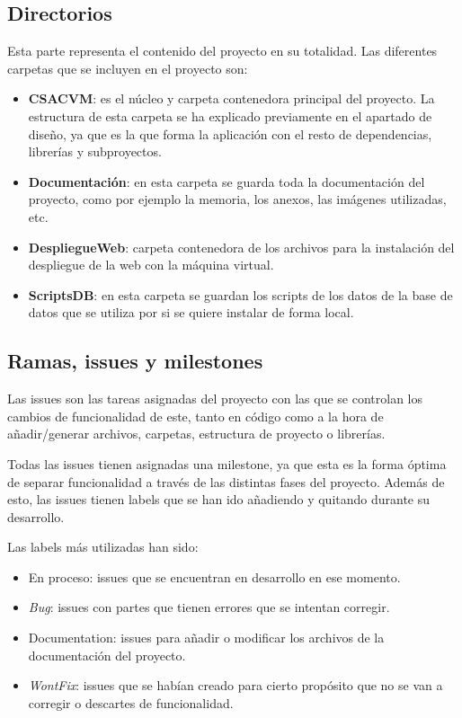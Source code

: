 \subsection{Directorios}
Esta parte representa el contenido del proyecto en su totalidad. Las diferentes carpetas que se incluyen en el proyecto son:
\begin{itemize}
    \item \textbf{CSACVM}: es el núcleo y carpeta contenedora principal del proyecto. La estructura de esta carpeta se ha explicado previamente en el apartado de diseño, ya que es la que forma la aplicación con el resto de dependencias, librerías y subproyectos.
    \item \textbf{Documentación}: en esta carpeta se guarda toda la documentación del proyecto, como por ejemplo la memoria, los anexos, las imágenes utilizadas, etc.
    \item \textbf{DespliegueWeb}: carpeta contenedora de los archivos para la instalación del despliegue de la web con la máquina virtual.
    \item \textbf{ScriptsDB}: en esta carpeta se guardan los scripts de los datos de la base de datos que se utiliza por si se quiere instalar de forma local.
\end{itemize}

\subsection{Ramas, issues y milestones}
Las issues son las tareas asignadas del proyecto con las que se controlan los cambios de funcionalidad de este, tanto en código como a la hora de añadir/generar archivos, carpetas, estructura de proyecto o librerías.

Todas las issues tienen asignadas una milestone, ya que esta es la forma óptima de separar funcionalidad a través de las distintas fases del proyecto. Además de esto, las issues tienen labels que se han ido añadiendo y quitando durante su desarrollo.

Las labels más utilizadas han sido:
\begin{itemize}
\tightlist
    \item En proceso: issues que se encuentran en desarrollo en ese momento.
    \item \emph{Bug}: issues con partes que tienen errores que se intentan corregir.
    \item Documentation: issues para añadir o modificar los archivos de la documentación del proyecto.
    \item \emph{WontFix}: issues que se habían creado para cierto propósito que no se van a corregir o descartes de funcionalidad.
\end{itemize}

